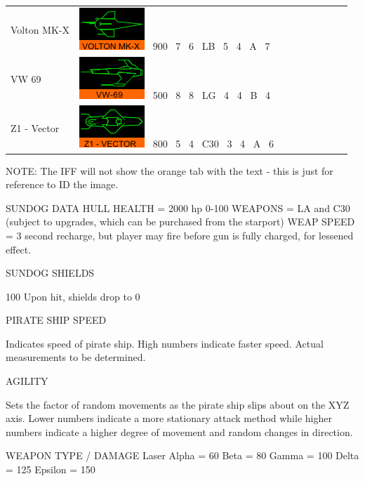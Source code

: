 \begin{itemize}
\begin{tabular}{ | l | l | l | l | l | l | l | l | l | }
Volton MK-X & \includegraphics{images/ship_volton_mk_x.png} \ 900 \ 7 \ 6 \ LB \ 5 \ 4 \ A \ 7 \\
VW 69 & \includegraphics{images/ship_VW-69.png} \ 500 \ 8 \ 8 \ LG \ 4 \ 4 \ B \ 4 \\
Z1 - Vector & \includegraphics{images/ship_z1_vector.png} \ 800 \ 5 \ 4 \ C30 \ 3 \ 4 \ A \ 6 \\

\hline
\end{tabular}

NOTE: The IFF will not show the orange tab with the text - this is just for reference to ID the image. 


SUNDOG DATA
        HULL HEALTH = 2000 hp 
		 0-100%
	WEAPONS = LA and C30 (subject to upgrades, which can be purchased from the starport)
 	WEAP SPEED = 3 second recharge, but player may fire before gun is fully charged, for lessened effect. 

SUNDOG SHIELDS

100%
Upon hit, shields drop to 0%

PIRATE SHIP SPEED

Indicates speed of pirate ship. High numbers indicate faster speed. Actual measurements to be determined. 

AGILITY 

Sets the factor of random movements as the pirate ship slips about on the XYZ axis. Lower numbers indicate a more stationary attack method while higher numbers indicate a higher degree of movement and random changes in direction.


WEAPON TYPE / DAMAGE 
Laser
	Alpha 	= 60		
	Beta 	= 80
	Gamma   = 100
	Delta 	= 125
	Epsilon = 150


\end{itemize}
